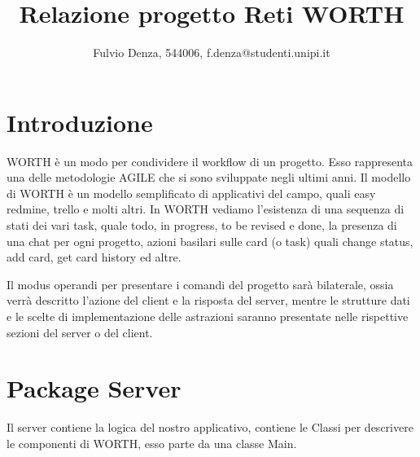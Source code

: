 \documentclass[]{article}
\title{Relazione progetto Reti WORTH}
\author{Fulvio Denza, 544006, f.denza@studenti.unipi.it}
\begin{document}
\maketitle

\section{Introduzione}
WORTH è un modo per condividere il workflow di un progetto. Esso rappresenta una delle metodologie AGILE che si sono sviluppate negli ultimi anni. Il modello di WORTH è un modello semplificato di applicativi del campo, quali easy redmine, trello e molti altri. In WORTH vediamo l'esistenza di una sequenza di stati dei vari task, quale todo, in progress, to be revised e done, la presenza di una chat per ogni progetto, azioni basilari sulle card (o task) quali change status, add card, get card history ed altre.

Il modus operandi per presentare i comandi del progetto sarà bilaterale, ossia verrà descritto l'azione del client e la risposta del server, mentre le strutture dati e le scelte di implementazione delle astrazioni saranno presentate nelle rispettive sezioni del server o del client.

\section{Package Server}
Il server contiene la logica del nostro applicativo, contiene le Classi per descrivere le componenti di WORTH, esso parte da una classe Main.
\end{document}
